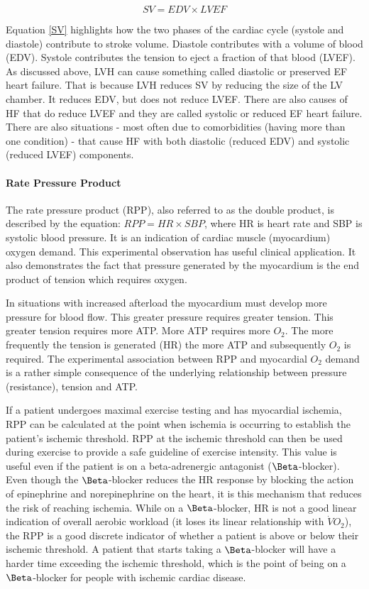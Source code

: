 \begin{equation}
    SV = EDV \times LVEF
    \label{SV}
\end{equation}

Equation \ref{SV} highlights how the two phases of the cardiac cycle (systole and diastole) contribute to stroke volume. Diastole contributes with a volume of blood (EDV). Systole contributes the tension to eject a fraction of that blood (LVEF). As discussed above, LVH can cause something called diastolic or preserved EF heart failure. That is because LVH reduces SV by reducing the size of the LV chamber. It reduces EDV, but does not reduce LVEF. There are also causes of HF that do reduce LVEF and they are called systolic or reduced EF heart failure. There are also situations - most often due to comorbidities (having more than one condition) - that cause HF with both diastolic (reduced EDV) and systolic (reduced LVEF) components. 

\paragraph{Rate Pressure Product}

The rate pressure product (RPP), also referred to as the double product, is described by the equation: $RPP = HR \times SBP$, where HR is heart rate and SBP is systolic blood pressure. It is an indication of cardiac muscle (myocardium) oxygen demand. This experimental observation has useful clinical application. It also demonstrates the fact that pressure generated by the myocardium is the end product of tension which requires oxygen.

In situations with increased afterload the myocardium must develop more pressure for blood flow. This greater pressure requires greater tension. This greater tension requires more ATP. More ATP requires more $O_2$. The more frequently the tension is generated (HR) the more ATP and subsequently $O_2$ is required. The experimental association between RPP and myocardial $O_2$ demand is a rather simple consequence of the underlying relationship between pressure (resistance), tension and ATP.

If a patient undergoes maximal exercise testing and has myocardial ischemia, RPP can be calculated at the point when ischemia is occurring to establish the patient’s ischemic threshold. RPP at the ischemic threshold can then be used during exercise to provide a safe guideline of exercise intensity. This value is useful even if the patient is on a beta-adrenergic antagonist ($\Beta$-blocker). Even though the $\Beta$-blocker reduces the HR response by blocking the action of epinephrine and norepinephrine on the heart, it is this mechanism that reduces the risk of reaching ischemia. While on a $\Beta$-blocker, HR is not a good linear indication of overall aerobic workload (it loses its linear relationship with $\dot{V}O_2$), the RPP is a good discrete indicator of whether a patient is above or below their ischemic threshold. A patient that starts taking a $\Beta$-blocker will have a harder time exceeding the ischemic threshold, which is the point of being on a $\Beta$-blocker for people with ischemic cardiac disease. 


